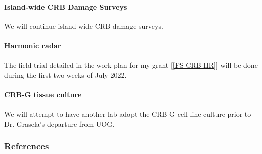 \begin{refsection}
\paragraph{Island-wide CRB Damage Surveys} We will continue island-wide CRB damage surveys.

\paragraph{Harmonic radar} The field trial detailed in the work plan for my grant [\ref{FS-CRB-HR}] will be done during the first two weeks of July 2022. 

\paragraph{CRB-G tissue culture} We will attempt to have another lab adopt the CRB-G cell line culture prior to Dr. Grasela's departure from UOG.

\subsubsection{References}
\printbibliography[heading=none]

\end{refsection}


